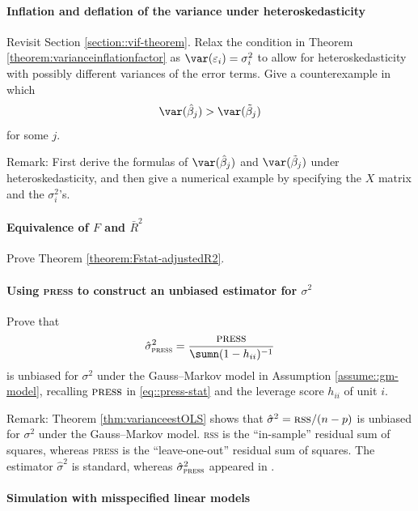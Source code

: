  


\paragraph{Inflation and deflation of the variance under heteroskedasticity}\label{hw12::inf-def-heteroskedasticity}


Revisit Section \ref{section::vif-theorem}. 
Relax the condition in Theorem \ref{theorem:varianceinflationfactor}  as $\var(\varepsilon_i) = \sigma_i^2$ to allow for heteroskedasticity with possibly different variances of the error terms.  Give a counterexample in which
$$
\var(\hat\beta_j)  > \var(\tilde\beta_j)
$$
for some $j$.

Remark: First derive the formulas of $\var(\hat\beta_j)  $ and $ \var(\tilde\beta_j)$ under heteroskedasticity, and then give a numerical example by specifying the $X$ matrix and the $\sigma_i^2$'s. 



\paragraph{Equivalence of $F$ and $\bar{R}^{2}$}\label{hw12::f-r2}

Prove Theorem \ref{theorem:Fstat-adjustedR2}. 


\paragraph{Using \textsc{press} to construct an unbiased estimator for $\sigma^2$}\label{hw12::press-unbiased-sigma2}


Prove that 
$$
\hat{\sigma}^{2}_{\textsc{press}} 
= 
\frac{  \textsc{press}  }{ \sumn (1-h_{ii})^{-1}   }
$$
is unbiased for $\sigma^2$ under the Gauss--Markov model in Assumption \ref{assume::gm-model}, recalling $\textsc{press} $ in \eqref{eq::press-stat} and the leverage score $h_{ii}$ of unit $i$. 


Remark: Theorem \ref{thm:varianceestOLS} shows that $\hat{\sigma}^{2}=\textsc{rss}/(n-p)$ is unbiased for $\sigma^2$ under the Gauss--Markov model. 
\textsc{rss} is the ``in-sample'' residual sum of squares, whereas \textsc{press} is the ``leave-one-out'' residual sum of squares. 
The estimator $\hat{\sigma}^{2}$ is standard, whereas $\hat{\sigma}^{2}_{\textsc{press}} $ appeared in \citet{shen2023algebraic}. 




\paragraph{Simulation with misspecified linear models}

